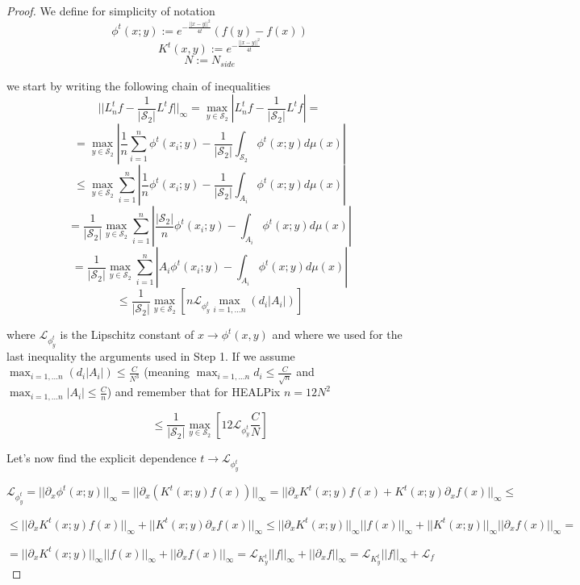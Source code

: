 \begin{proof}
	
	We define for simplicity of notation
	$$\phi^t(x;y) := e^{-\frac{||x-y||^2}{4t}}\left(f(y)-f(x)\right)$$
	$$K^t(x,y) :=  e^{-\frac{||x-y||^2}{4t}}$$
	$$N := N_{side}$$
	
	we start by writing the following chain of inequalities
	$$||L_n^tf-\frac{1}{|\mathcal S_2|}L^tf||_\infty = \max _{y\in \mathcal S_2} \left|L_n^tf-\frac{1}{|\mathcal S_2|}L^tf\right|=$$
	$$= \max _{y\in \mathcal S_2} \left| \frac{1}{n} \sum_{i=1}^n \phi^t(x_i; y)-\frac{1}{|\mathcal S_2|} \int_{\mathcal S_2} \phi^t(x;y)d\mu(x) \right|$$
	$$\leq \max _{y\in \mathcal S_2} \sum_{i=1}^n  \left| \frac{1}{n}  \phi^t(x_i; y)-\frac{1}{|\mathcal S_2|} \int_{A_i} \phi^t(x;y)d\mu(x) \right|$$
	$$= \frac{1}{|\mathcal S_2|} \max _{y\in \mathcal S_2} \sum_{i=1}^n  \left| \frac{|\mathcal S_2|}{n}  \phi^t(x_i; y)-\int_{A_i} \phi^t(x;y)d\mu(x) \right|$$
	$$= \frac{1}{|\mathcal S_2|} \max _{y\in \mathcal S_2} \sum_{i=1}^n  \left| A_i  \phi^t(x_i; y)-\int_{A_i} \phi^t(x;y)d\mu(x) \right|$$
	$$\leq \frac{1}{|\mathcal S_2|} \max _{y\in \mathcal S_2} \left[ n \mathcal L_{\phi^t_y} \max_{i=1,...n} (d_i|A_i|)  \right]$$
	
	where $\mathcal L_{\phi^t_y}$ is the Lipschitz constant of $x \rightarrow \phi^t(x, y)$ and where we used for the last inequality the arguments used in Step 1. If we assume $\max_{i=1,...n} (d_i|A_i|) \leq \frac{C}{N^3}$ (meaning $\max_{i=1,...n} d_i \leq \frac{C}{\sqrt{n}}$ and $\max_{i=1,...n} |A_i| \leq \frac{C}{n}$)
	and remember that for HEALPix $n=12N^2$
	
	$$\leq \frac{1}{|\mathcal S_2|} \max _{y\in \mathcal S_2} \left[ 12 \mathcal L_{\phi^t_y} \frac{C}{N} \right]$$
	
	Let's now find the explicit dependence $t\rightarrow \mathcal L_{\phi^t_y}$
	
	$\mathcal L_{\phi^t_y} = ||\partial_x\phi^t(x;y)||_\infty = ||\partial_x\left(K^t(x;y)f(x)\right)||_\infty = ||\partial_x K^t(x;y)f(x) + K^t(x;y)\partial_x f(x)||_\infty \leq$
	
	$ \leq ||\partial_x K^t(x;y)f(x)||_\infty + ||K^t(x;y)\partial_x f(x)||_\infty \leq  ||\partial_x K^t(x;y)||_\infty||f(x)||_\infty + ||K^t(x;y)||_\infty||\partial_x f(x)||_\infty = $
	
	$ = ||\partial_x K^t(x;y)||_\infty||f(x)||_\infty + ||\partial_x f(x)||_\infty = \mathcal L_{K^t_y} ||f||_\infty + ||\partial_xf||_\infty = \mathcal L_{K^t_y} ||f||_\infty + \mathcal L_f$
	

\end{proof}
